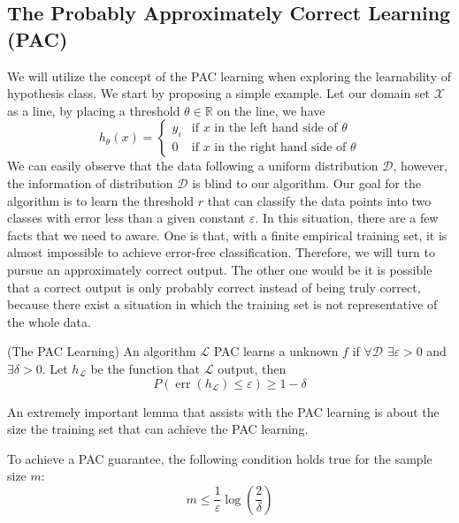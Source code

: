 \subsection {The Probably Approximately Correct Learning (PAC)}
    We will utilize the concept of the PAC learning when exploring the learnability of hypothesis class. We start by proposing a simple example. Let our domain set $\mathcal{X}$ as a line, by placing a threshold $\theta \in \mathbb{R}$ on the line, we have
    \[
  h_{\theta}(x) =
  \begin{cases}
                                   y_{i} & \text{if $x$ in the left hand side of $\theta$} \\
                                   0 & \text{if $x$ in the right hand side of $\theta$} 
  \end{cases}
\]
We can easily observe that the data following a uniform distribution $\mathcal{D}$, however, the information of distribution $\mathcal{D}$ is blind to our algorithm. Our goal for the algorithm is to learn the threshold $r$ that can classify the data points into two classes with error less than a given constant $\varepsilon$. In this situation, there are a few facts that we need to aware. One is that, with a finite empirical training set, it is almost impossible to achieve error-free classification. Therefore, we will turn to pursue an approximately correct output. The other one would be it is possible that a correct output is only probably correct instead of being truly correct, because there exist a situation in which the training set is not representative of the whole data. 


\begin{definition} (The PAC Learning)
    An algorithm $\mathcal{L}$ PAC learns a unknown $f$ if $\forall \mathcal{D}$ $\exists \varepsilon>0$ and $\exists \delta >0$. Let $h_{\mathcal{L}}$ be the function that $\mathcal{L}$ output, then 
    \begin{equation*}
        P(\operatorname{err}(h_{\mathcal{L}}) \leq \varepsilon) \geq 1 - \delta
    \end{equation*}
\end{definition}
\noindent An extremely important lemma that assists with the PAC learning is about the size the training set that can achieve the PAC learning. 

\begin{lemma}
To achieve a PAC guarantee, the following condition holds true for the sample size $m$:
\begin{equation*}
    m \leq \frac{1}{\varepsilon}\log(\frac{2}{\delta})
\end{equation*}
\end{lemma}

